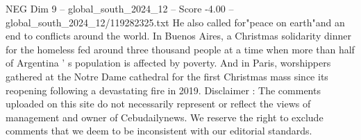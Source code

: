 \begin{textsample}{NEG Dim 9 – global\_south\_2024\_12 – Score -4.00 – global\_south\_2024\_12/119282325.txt}
He also called for"peace on earth"and an end to conflicts around the world.
In Buenos Aires, a Christmas solidarity dinner for the homeless fed around three thousand people at a time when more than half of Argentina ' s population is affected by poverty.
And in Paris, worshippers gathered at the Notre Dame cathedral for the first Christmas mass since its reopening following a devastating fire in 2019.
Disclaimer : The comments uploaded on this site do not necessarily represent or reflect the views of management and owner of Cebudailynews.
We reserve the right to exclude comments that we deem to be inconsistent with our editorial standards.

\end{textsample}
